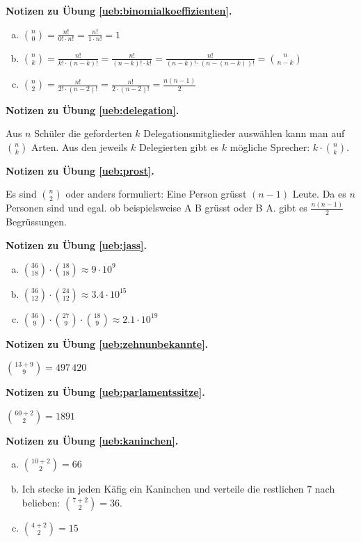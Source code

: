 \documentclass[%
11pt,%
twoside,%
titlepage,%
german,%
headsepline%
]{scrartcl}
\newcommand{\concatueb}[1]{ueb:#1}%
\newcommand{\concatlsg}[1]{lsg:#1}%
\newenvironment{lsg}[1]{%
    \par\noindent\textbf{Notizen zu Übung \ref{\concatueb{#1}}.}%
    \label{\concatlsg{#1}}
}{%
    \par%
}
\begin{document}
\begin{lsg}{binomialkoeffizienten}
\begin{enumerate}[a)]
\item $\binom{n}{0}=\frac{n!}{0!\cdot n!}=\frac{n!}{1\cdot n!}=1$
\item $\binom{n}{k}=\frac{n!}{k!\cdot (n-k)!}=\frac{n!}{(n-k)!\cdot k!}=\frac{n!}{(n-k)!\cdot (n-(n-k))!}=\binom{n}{n-k}$
\item $\binom{n}{2}=\frac{n!}{2!\cdot(n-2)!}=\frac{n!}{2\cdot(n-2)!}=\frac{n(n-1)}{2}$
\end{enumerate}
\end{lsg}
\begin{lsg}{delegation}
Aus $n$ Schüler die geforderten $k$ Delegationsmitglieder ausw\"ahlen kann man auf $\binom{n}{k}$ Arten. Aus den jeweils $k$ Delegierten gibt es $k$ m\"ogliche Sprecher: $k\cdot\binom{n}{k}$.
\end{lsg}
\begin{lsg}{prost}
Es sind $\binom{n}{2}$ oder anders formuliert: Eine Person gr\"usst $(n-1)$ Leute. Da es $n$ Personen sind und egal. ob beispielsweise A B gr\"usst oder B A. gibt es $\frac{n(n-1)}{2}$ Begr\"ussungen.
\end{lsg}
\begin{lsg}{jass}
\begin{enumerate}[a)]
\item $\binom{36}{18}\cdot\binom{18}{18}\approx9\cdot10^{9}$
\item $\binom{36}{12}\cdot\binom{24}{12}\approx3.4\cdot10^{15}$
\item $\binom{36}{9}\cdot\binom{27}{9}\cdot\binom{18}{9}\approx2.1\cdot10^{19}$
\end{enumerate}
\end{lsg}
\begin{lsg}{zehnunbekannte}
$\binom{13+9}{9}=497\,420$
\end{lsg}
\begin{lsg}{parlamentssitze}
$\binom{60+2}{2}=1891$
\end{lsg}
\begin{lsg}{kaninchen}
\begin{enumerate}[a)]
\item $\binom{10+2}{2}=66$
\item Ich stecke in jeden K\"afig ein Kaninchen und verteile die restlichen $7$ nach belieben: $\binom{7+2}{2}=36$.
\item $\binom{4+2}{2}=15$
\end{enumerate}
\end{lsg}
\end{document}
